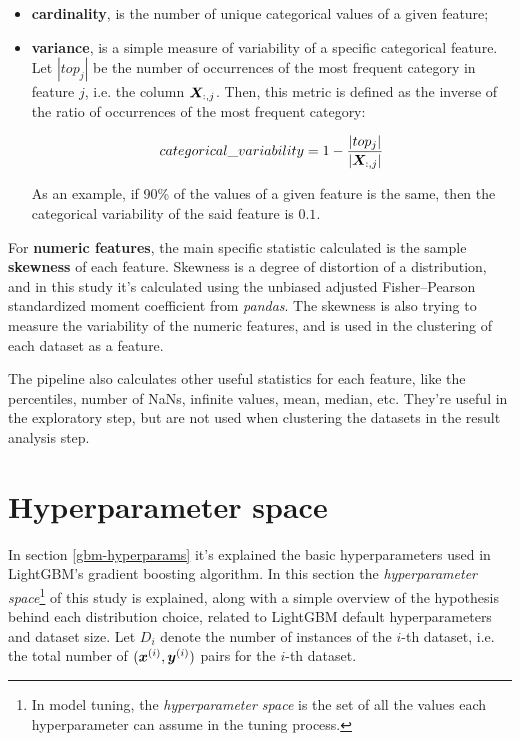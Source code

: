 \begin{itemize}
    \item \textbf{cardinality}, is the number of unique categorical values of a given feature;
    \item \textbf{variance}, is  a simple measure of variability of a specific categorical feature.
    Let $|top_{j}|$ be the number of occurrences of the most frequent category in feature $j$, i.e. the column $\bm{X}_{:, j}$. Then, this metric is defined as the inverse of the ratio of occurrences of the most frequent category:

    $$categorical\_variability=1 - \frac{|top_{j}|}{|\bm{X}_{:, j}|}$$

    As an example, if 90\% of the values of a given feature is the same, then the categorical variability of the said feature is $0.1$.
\end{itemize}

For \textbf{numeric features}, the main specific statistic calculated is the sample \textbf{skewness} of each feature. Skewness is a degree of distortion of a distribution, and in this study it's calculated using the unbiased adjusted Fisher–Pearson standardized moment coefficient from \textit{pandas}. The skewness is also trying to measure the variability of the numeric features, and is used in the clustering of each dataset as a feature.

The pipeline also calculates other useful statistics for each feature, like the percentiles, number of NaNs, infinite values, mean, median, etc. They're useful in the exploratory step, but are not used when clustering the datasets in the result analysis step.

\section{Hyperparameter space}

In section \ref{gbm-hyperparams} it's explained the basic hyperparameters used in LightGBM's gradient boosting algorithm. In this section the \textit{hyperparameter space}\footnote{In model tuning, the \textit{hyperparameter space} is the set of all the values each hyperparameter can assume in the tuning process.} of this study is explained, along with a simple overview of the hypothesis behind each distribution choice, related to LightGBM default hyperparameters and dataset size.  Let $D_i$ denote the number of instances of the $i$-th dataset, i.e. the total number of $(\bm{x}^{(i)},\bm{y}^{(i)})$ pairs for the $i$-th dataset. 

